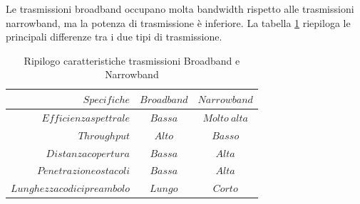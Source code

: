 \documentclass[12pt,a4paper,openright,twoside]{report}
\begin{document}
\par\bigskip 
\noindent
Le trasmissioni broadband occupano molta bandwidth rispetto alle trasmissioni narrowband, ma la potenza di trasmissione \`e inferiore.
La tabella \ref{tab:uno} riepiloga le principali differenze tra i due tipi di trasmissione.


\begin{table}[h]                        %
\begin{center}                          %
\begin{tabular}{r|c|c}                  %
$Specifiche$ & $Broadband$ & $Narrowband$\\           %
\hline\hline                                   %
$Efficienza spettrale$ & $Bassa$ & $Molto\ alta$\\           %
\hline                                  %
$Throughput$ & $Alto$ & $Basso$\\
\hline                                  %
$Distanza copertura$ & $Bassa$ & $Alta$\\
\hline                                  %
$Penetrazione ostacoli$ & $Bassa$ & $$Alta$$\\
\hline                                  %
$Lunghezza codici preambolo$ & $Lungo$ & $Corto$\\
\hline \hline                           %
\end{tabular}
\caption[Ripilogo caratteristiche trasmissioni Broadband e Narrowband]{Ripilogo caratteristiche trasmissioni Broadband e Narrowband}\label{tab:uno}
\end{center}
\end{table}
\end{document}
